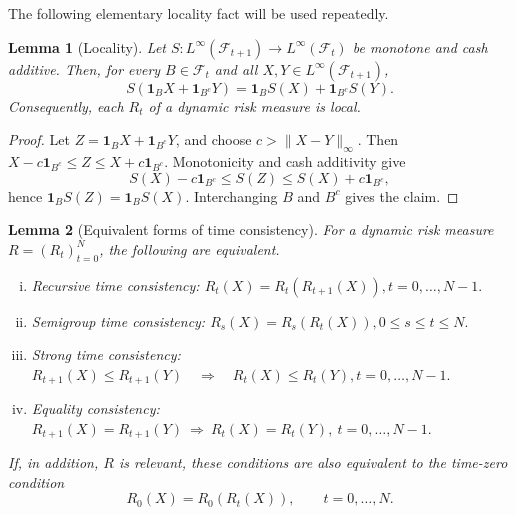 \documentclass[a4paper]{amsart}
\newtheorem{lemma}[lemma]{Lemma}
\theoremstyle{definition}
\newcommand{\F}{\mathcal{F}}
\begin{document}
The following elementary locality fact will be used repeatedly.

\begin{lemma}[Locality]
\label{lem:locality}
Let \(S:L^\infty(\F_{t+1})\to L^\infty(\F_t)\) be monotone and cash additive.
Then, for every \(B\in\F_t\) and all \(X,Y\in L^\infty(\F_{t+1})\),
\[
S(\mathbf 1_BX+\mathbf 1_{B^c}Y)
=
\mathbf 1_BS(X)+\mathbf 1_{B^c}S(Y).
\]
Consequently, each \(R_t\) of a dynamic risk measure is local.
\end{lemma}

\begin{proof}
Let \(Z=\mathbf 1_BX+\mathbf 1_{B^c}Y\), and choose
\(c>\|X-Y\|_\infty\). Then
\(X-c\mathbf 1_{B^c}\le Z\le X+c\mathbf 1_{B^c}\). Monotonicity and cash
additivity give
\[
S(X)-c\mathbf 1_{B^c}\le S(Z)\le S(X)+c\mathbf 1_{B^c},
\]
hence \(\mathbf 1_BS(Z)=\mathbf 1_BS(X)\). Interchanging \(B\) and \(B^c\)
gives the claim.
\end{proof}

\begin{lemma}[Equivalent forms of time consistency]
\label{lem:time-consistency-equivalences}
For a dynamic risk measure \(R=(R_t)_{t=0}^N\), the following are equivalent.

\begin{enumerate}[(i)]
\item Recursive time consistency:
\(
R_t(X)=R_t(R_{t+1}(X)),
 t=0,\dots,N-1.
\)

\item Semigroup time consistency:
\(
R_s(X)=R_s(R_t(X)),
 0\le s\le t\le N.
\)

\item Strong time consistency:
\(
R_{t+1}(X)\le R_{t+1}(Y)
\quad\Longrightarrow\quad
R_t(X)\le R_t(Y),
 t=0,\dots,N-1.
\)

\item Equality consistency:
\(
R_{t+1}(X)=R_{t+1}(Y)
\ \Longrightarrow\ 
R_t(X)=R_t(Y),
\ t=0,\dots,N-1.
\)
\end{enumerate}

If, in addition, \(R\) is relevant, these conditions are also equivalent to
the time-zero condition
\[
R_0(X)=R_0(R_t(X)),
\qquad t=0,\dots,N.
\]
\end{lemma}
\end{document}
